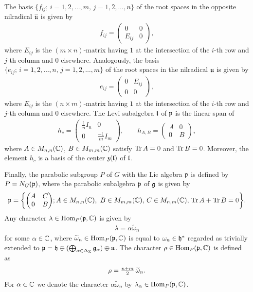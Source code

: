 The basis $\{f_{ij};\, i=1,2,\dots,m,\, j=1,2,\dots,n\}$ of the root spaces in the opposite nilradical $\overline{\mathfrak{u}}$ is given by
\begin{align}
  f_{ij} = \begin{pmatrix}
    0 & 0 \\
    E_{ij} & 0
  \end{pmatrix}\!,
\end{align}
where $E_{ij}$ is the $(m \times n)$-matrix having $1$ at the intersection of the $i$-th row and $j$-th column and $0$ elsewhere. Analogously, the basis $\{e_{ij};\, i=1,2,\dots,n,\, j=1,2,\dots,m\}$ of the root spaces in the nilradical $\mathfrak{u}$ is given by
\begin{align}
  e_{ij} = \begin{pmatrix}
    0 & E_{ij} \\
    0 & 0
  \end{pmatrix}\!,
\end{align}
where $E_{ij}$ is the $(n \times m)$-matrix having $1$ at the intersection of the $i$-th row and $j$-th column and $0$ elsewhere. The Levi subalgebra $\mathfrak{l}$ of $\mathfrak{p}$ is the linear span of
\begin{align}
  h_c = \begin{pmatrix}
    \frac{1}{n} I_n & 0 \\
    0 & \frac{-1}{m} I_m
  \end{pmatrix}\!, \qquad
  h_{A,B} = \begin{pmatrix}
    A & 0 \\
    0 & B
  \end{pmatrix}\!,
\end{align}
where $A \in M_{n,n}(\mathbb{C})$, $B \in M_{m,m}(\mathbb{C})$ satisfy $\operatorname{\mathrm{Tr}} A=0$ and $\operatorname{\mathrm{Tr}} B=0$. Moreover,
the element $h_c$ is a basis of the center $\mathfrak{z}(\mathfrak{l})$ of $\mathfrak{l}$.

Finally, the parabolic subgroup $P$ of $G$ with the Lie algebra $\mathfrak{p}$ is defined by $P=N_G(\mathfrak{p})$, where the parabolic subalgebra $\mathfrak{p}$ of $\mathfrak{g}$ is given by
\begin{align}
  \mathfrak{p}=\left\{\begin{pmatrix}
    A & C \\
    0 & B
  \end{pmatrix}\!;
   A \in M_{n,n}(\mathbb{C}),\ B \in M_{m,m}(\mathbb{C}),\, C \in M_{n,m}(\mathbb{C}),\, \operatorname{\mathrm{Tr}} A + \operatorname{\mathrm{Tr}} B =0
  \right\}\!.
\end{align}
Any character $\lambda \in \mathrm{Hom}_P(\mathfrak{p},\mathbb{C})$ is given by
\begin{align}
  \lambda= \alpha \widetilde{\omega}_n
\end{align}
for some $\alpha \in \mathbb{C}$, where $\widetilde{\omega}_n\in \mathrm{Hom}_P(\mathfrak{p},\mathbb{C})$
is equal to $\omega_n\in \mathfrak{h}^*$ regarded as trivially extended to
$\mathfrak{p} =\mathfrak{h} \oplus (\bigoplus_{\alpha \in \Delta_\Sigma} \mathfrak{g}_\alpha) \oplus \mathfrak{u}$.
The character $\rho \in \mathrm{Hom}_P(\mathfrak{p},\mathbb{C})$  is defined as
\begin{align}
  \rho={\textstyle {n+m \over 2}}\,\widetilde{\omega}_n.
\end{align}
For $\alpha \in \mathbb{C}$ we denote the character $\alpha \widetilde{\omega}_n$ by $\lambda_\alpha \in \mathrm{Hom}_P(\mathfrak{p},\mathbb{C})$.
\medskip


